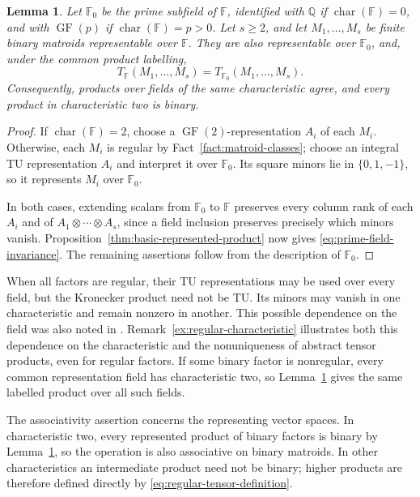 \documentclass[12pt,a4paper]{article}
\numberwithin{equation}{section}
\newcommand{\F}{\mathbb F}
\newcommand{\QQ}{\mathbb Q}
\newtheorem{lemma}[lemma]{Lemma}
\theoremstyle{definition}
\theoremstyle{remark}
\begin{document}
\begin{lemma}\label{lem:prime-field-reduction}
Let \(\F_0\) be the prime subfield of \(\F\), identified with
\(\QQ\) if \(\operatorname{char}(\F)=0\), and with
\(\operatorname{GF}(p)\) if \(\operatorname{char}(\F)=p>0\).
Let \(s\ge2\), and let \(M_1,\ldots,M_s\) be finite binary matroids
representable over \(\F\).  They are also representable over \(\F_0\),
and, under the common product labelling,
\begin{equation}\label{eq:prime-field-invariance}
 T_{\F}(M_1,\ldots,M_s)=T_{\F_0}(M_1,\ldots,M_s).
\end{equation}
Consequently, products over fields of the same characteristic agree,
and every product in characteristic two is binary.
\end{lemma}
\begin{proof}
If \(\operatorname{char}(\F)=2\), choose a
\(\operatorname{GF}(2)\)-representation \(A_i\) of each \(M_i\).
Otherwise, each \(M_i\) is regular by
Fact~\ref{fact:matroid-classes}; choose an integral TU representation
\(A_i\) \cite[Theorem~6.6.3]{oxley} and interpret it over \(\F_0\).
Its square minors lie in \(\{0,1,-1\}\), so it represents
\(M_i\) over \(\F_0\).

In both cases, extending scalars from \(\F_0\) to \(\F\) preserves
every column rank of each \(A_i\) and of
\(A_1\otimes\cdots\otimes A_s\), since a field inclusion
preserves precisely which minors vanish.  Proposition~\ref{thm:basic-represented-product}
now gives \eqref{eq:prime-field-invariance}.
The remaining assertions follow from the description of \(\F_0\).
\end{proof}

When all factors are regular, their TU representations may be used
over every field, but the Kronecker product need not be TU.
Its minors may vanish in one characteristic and remain nonzero in
another.  This possible dependence on the field was also noted in
\cite[Remark~4.15 of the expanded version]{berczi-skew-tensor}.
Remark~\ref{ex:regular-characteristic} illustrates both this
dependence on the characteristic and the nonuniqueness of abstract
tensor products, even for regular factors.  If some binary factor is
nonregular, every common representation field has characteristic two,
so Lemma~\ref{lem:prime-field-reduction} gives the same labelled
product over all such fields.

The associativity assertion concerns the representing vector spaces.
In characteristic two, every represented product of binary factors is
binary by Lemma~\ref{lem:prime-field-reduction}, so the operation
is also associative on binary matroids.  In other characteristics an
intermediate product need not be binary; higher products are therefore
defined directly by \eqref{eq:regular-tensor-definition}.
\end{document}
